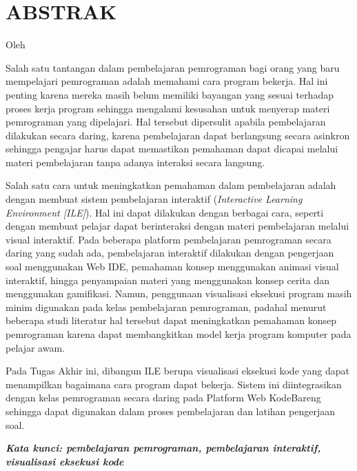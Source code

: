 \clearpage
\chapter*{ABSTRAK}

\begin{center}
  \center
  \large \bfseries \MakeUppercase{\thetitle}

  \normalfont\normalsize
  Oleh

  \theauthor
\end{center}

\vspace{1cm}

\begin{singlespace}
  Salah satu tantangan dalam pembelajaran pemrograman bagi orang yang baru mempelajari pemrograman adalah memahami cara program bekerja. Hal ini penting karena mereka masih belum memiliki bayangan yang sesuai terhadap proses kerja program sehingga mengalami kesusahan untuk menyerap materi pemrograman yang dipelajari. Hal tersebut dipersulit apabila pembelajaran dilakukan secara daring, karena pembelajaran dapat berlangsung secara asinkron sehingga pengajar harus dapat memastikan pemahaman dapat dicapai melalui materi pembelajaran tanpa adanya interaksi secara langsung.

  Salah satu cara untuk meningkatkan pemahaman dalam pembelajaran adalah dengan membuat sistem pembelajaran interaktif (\textit{Interactive Learning Environment [ILE]}). Hal ini dapat dilakukan dengan berbagai cara, seperti dengan membuat pelajar dapat berinteraksi dengan materi pembelajaran melalui visual interaktif. Pada beberapa platform pembelajaran pemrograman secara daring yang sudah ada, pembelajaran interaktif dilakukan dengan pengerjaan soal menggunakan Web IDE, pemahaman konsep menggunakan animasi visual interaktif, hingga penyampaian materi yang menggunakan konsep cerita dan menggunakan gamifikasi. Namun, penggunaan visualisasi eksekusi program masih minim digunakan pada kelas pembelajaran pemrograman, padahal menurut beberapa studi literatur hal tersebut dapat meningkatkan pemahaman konsep pemrograman karena dapat membangkitkan model kerja program komputer pada pelajar awam.

  Pada Tugas Akhir ini, dibangun ILE berupa visualisasi eksekusi kode yang dapat menampilkan bagaimana cara program dapat bekerja. Sistem ini diintegrasikan dengan kelas pemrograman secara daring pada Platform Web KodeBareng sehingga dapat digunakan dalam proses pembelajaran dan latihan pengerjaan soal. %
\end{singlespace}

\textbf{\textit{Kata kunci: pembelajaran pemrograman, pembelajaran interaktif, visualisasi eksekusi kode}}
\clearpage